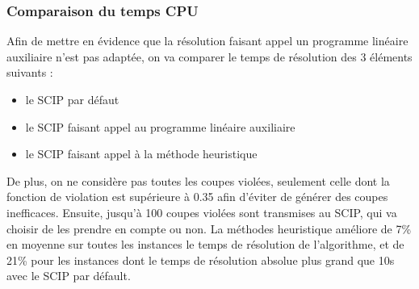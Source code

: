\documentclass[12pt]{report}
\begin{document}
\subsubsection{Comparaison du temps CPU}
Afin de mettre en évidence que la résolution faisant appel un programme linéaire auxiliaire n'est pas adaptée, on va comparer le temps de résolution des 3 éléments suivants :
\begin{itemize}
    \item le SCIP par défaut
    \item le SCIP faisant appel au programme linéaire auxiliaire 
    \item le SCIP faisant appel à la méthode heuristique
\end{itemize}
De plus, on ne considère pas toutes les coupes violées, seulement celle dont la fonction de violation est supérieure à 0.35 afin d'éviter de générer des coupes inefficaces. Ensuite, jusqu'à 100 coupes violées sont transmises au SCIP, qui va choisir de les prendre en compte ou non.
La méthodes heuristique améliore de 7\% en moyenne sur toutes les instances le temps de résolution de l'algorithme, et de 21\% pour les instances dont le temps de résolution absolue plus grand que 10s avec le SCIP par défault.




\end{document}
